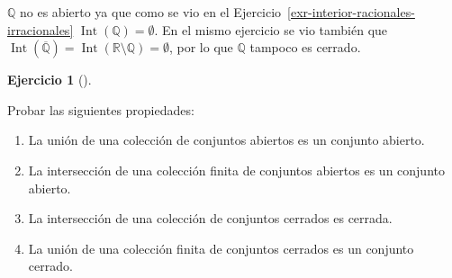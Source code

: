\documentclass[
  spanish,
  a4paper,
]{scrreport}
\providecommand{\tightlist}{%
  \setlength{\itemsep}{0pt}\setlength{\parskip}{0pt}}
\theoremstyle{definition}
\newtheorem{exercise}{Ejercicio}[chapter]
\theoremstyle{remark}
\begin{document}
\begin{tcolorbox}[enhanced jigsaw, arc=.35mm, bottomrule=.15mm, bottomtitle=1mm, breakable, colback=white, colbacktitle=quarto-callout-tip-color!10!white, colframe=quarto-callout-tip-color-frame, coltitle=black, left=2mm, leftrule=.75mm, opacityback=0, opacitybacktitle=0.6, rightrule=.15mm, title=\textcolor{quarto-callout-tip-color}{\faLightbulb}\hspace{0.5em}{Solución}, titlerule=0mm, toprule=.15mm, toptitle=1mm]

\(\mathbb{Q}\) no es abierto ya que como se vio en el
Ejercicio~\ref{exr-interior-racionales-irracionales}
\(\operatorname{Int}(\mathbb{Q})=\emptyset\). En el mismo ejercicio se
vio también que
\(\operatorname{Int}(\overline{\mathbb{Q}})=\operatorname{Int}(\mathbb{R}\setminus \mathbb{Q})=\emptyset\),
por lo que \(\mathbb{Q}\) tampoco es cerrado.

\end{tcolorbox}

\begin{exercise}[]\protect\hypertarget{exr-union-interseccion-coleccion-abiertos-cerrados}{}\label{exr-union-interseccion-coleccion-abiertos-cerrados}

Probar las siguientes propiedades:

\begin{enumerate}
\def\labelenumi{\alph{enumi}.}
\tightlist
\item
  La unión de una colección de conjuntos abiertos es un conjunto
  abierto.
\item
  La intersección de una colección finita de conjuntos abiertos es un
  conjunto abierto.
\item
  La intersección de una colección de conjuntos cerrados es cerrada.
\item
  La unión de una colección finita de conjuntos cerrados es un conjunto
  cerrado.
\end{enumerate}

\end{exercise}
\end{document}
